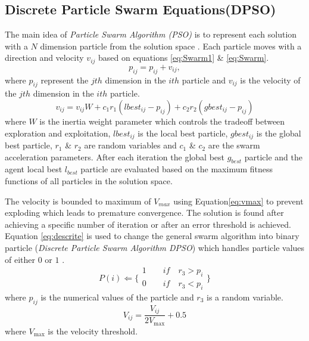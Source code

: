 \subsection{Discrete Particle Swarm Equations(DPSO)}
The main idea of \textit{Particle Swarm Algorithm (PSO)} is to represent each solution with a $N$ dimension particle from the solution space \cite{PSOFirst}. Each particle moves with a direction and velocity $v_{ij}$ based on equations \ref{eq:Swarm1} \& \ref{eq:Swarm}.
\begin{equation}
p_{ij}=p_{ij}+v_{ij},
\label{eq:Swarm1}
\end{equation}
where $p_{ij}$ represent the $jth$ dimension in the $ith$ particle and $v_{ij}$ is the velocity of the $jth$ dimension in the $ith$ particle.
 \begin{equation}
v_{ij}  = v_{ij} W  + c_1 r_1 (lbest_{ij}  - p_{ij} ) + c_2 r_2 (gbest_{ij}  - p_{ij} )
\label{eq:Swarm}
\end{equation}
 where $W$ is the inertia weight parameter which controls the tradeoff between exploration and exploitation, $lbest_{ij}$ is the local best particle, $gbest_{ij}$ is the global best particle, $r_1$ \& $r_2$ are random variables and $c_1$ \& $c_2$ are the swarm acceleration parameters.
 After each iteration the global best $g_{best}$ particle and the agent local best $l_{best}$ particle are evaluated based on the maximum fitness functions of all particles in the solution space. 
 
 The velocity is bounded to maximum of $V_{max}$ using Equation\ref{eq:vmax} to prevent exploding which leads to premature convergence. The solution is found after achieving a specific number of iteration or after an error threshold is achieved.
Equation \ref{eq:descrite} is used to change the general swarm algorithm into binary particle (\textit{Discrete Particle Swarm Algorithm DPSO}) which handles particle values of either $0$ or $1$ \cite{PSODisceret}. 
 \begin{equation}
   P(i)\Leftarrow 
\{
\begin{array}{c} 
1 \quad \quad if\quad r_{3}>p_{i}  \\

0 \quad \quad if\quad r_{3}<p_{i} 
\label{eq:descrite}
\end{array}\}
\end{equation} where $p_{ij}$ is the numerical values of the particle and $r_{3}$ is a random variable. 
  \begin{equation}
V_{ij}  = \frac{{V_{ij} }}{{2V_{\max } }} + 0.5
\label{eq:vmax}
\end{equation} where $V_{\max }$ is the velocity threshold.


